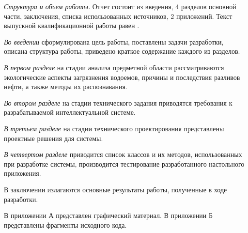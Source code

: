 \emph{Структура и объем работы.} Отчет состоит из введения, 4 разделов основной части, заключения, списка использованных источников, 2 приложений. Текст выпускной квалификационной работы равен .

\emph{Во введении} сформулирована цель работы, поставлены задачи разработки, описана структура работы, приведено краткое содержание каждого из разделов.

\emph{В первом разделе} на стадии анализа предметной области рассматриваются экологические аспекты загрязнения водоемов, причины и последствия разливов нефти, а также методы их распознавания.

\emph{Во втором разделе} на стадии технического задания приводятся требования к разрабатываемой интеллектуальной системе.

\emph{В третьем разделе} на стадии технического проектирования представлены проектные решения для системы.

\emph{В четвертом разделе} приводится список классов и их методов, использованных при разработке системы, производится тестирование разработанного настольного приложения.

В заключении излагаются основные результаты работы, полученные в ходе разработки.

В приложении А представлен графический материал.
В приложении Б представлены фрагменты исходного кода. 
